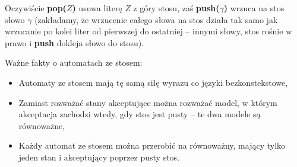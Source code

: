 Oczywiście \textbf{pop($Z$)} usuwa literę $Z$ z góry stosu, zaś \textbf{push($\gamma$)} wrzuca na stos słowo $\gamma$ (zakładamy, że wrzucenie całego słowa na stos działa tak samo jak wrzucanie po kolei liter od pierwszej do ostatniej -- innymi słowy, stos rośnie w prawo i \textbf{push} dokleja słowo do stosu).

Ważne fakty o automatach ze stosem:
\begin{itemize}
    \item Automaty ze stosem mają tę samą siłę wyrazu co języki bezkonstekstowe,
    \item Zamiast rozważać stany akceptujące można rozważać model, w którym akceptacja zachodzi wtedy, gdy stos jest pusty -- te dwa modele są równoważne,
    \item Każdy automat ze stosem można przerobić na równoważny, mający tylko jeden stan i akceptujący poprzez pusty stos.
\end{itemize}

